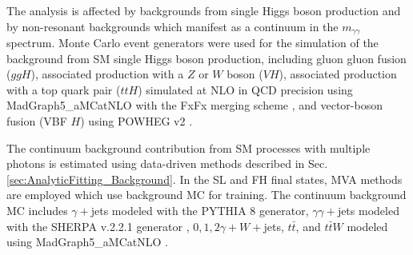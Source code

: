 
The analysis is affected by backgrounds from single Higgs boson production and by non-resonant backgrounds which manifest as a continuum in the $m_{\gamma\gamma}$ spectrum.
Monte Carlo event generators were used for the simulation of the background from SM single Higgs boson production, including
gluon gluon fusion ($ggH$), associated production with a $Z$ or $W$ boson ($VH$), associated production with a top quark pair ($ttH$)
simulated at NLO in QCD precision using MadGraph5\_aMCatNLO \cite{Alwall:2014hca, Artoisenet:2012st} with the FxFx merging scheme \cite{Frederix:2012ps},
and vector-boson fusion (VBF $H$) using POWHEG v2 \cite{Nason:2004rx, Frixione:2007vw}.

The continuum background contribution from SM processes with multiple photons is estimated using data-driven methods described in Sec. \ref{sec:AnalyticFitting_Background}. In the SL and 
FH final states, MVA methods are employed which use background MC for training.
The continuum background MC includes $\gamma+$jets modeled with the PYTHIA 8 \cite{Sjostrand:2014zea} generator, $\gamma\gamma+$jets modeled with the SHERPA v.2.2.1 generator \cite{Bothmann:2019yzt}, $0,1,2\gamma+W+$jets, $t\bar{t}$, and $t\bar{t}W$ modeled using MadGraph5\_aMCatNLO \cite{Alwall:2014hca,Artoisenet:2012st,Frederix:2012ps}.




